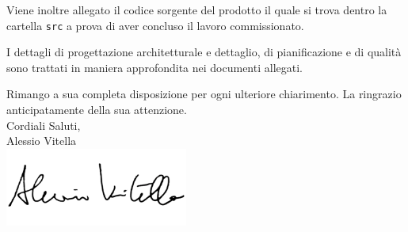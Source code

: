 \documentclass[12pt,a4paper]{article}
\newcommand{\AVI}{Alessio Vitella}
\begin{document}
Viene inoltre allegato il codice sorgente del prodotto il quale si trova dentro la cartella \texttt{src} a prova di aver concluso il lavoro commissionato.

\newpage

I dettagli di progettazione architetturale e dettaglio, di pianificazione e di qualità sono trattati in maniera approfondita nei documenti allegati.

Rimango a sua completa disposizione per ogni ulteriore chiarimento. La ringrazio anticipatamente della sua attenzione.\\

Cordiali Saluti,\\
\AVI \\
\includegraphics[width=6cm]{../img/firmaVitella.png}
\end{document}
